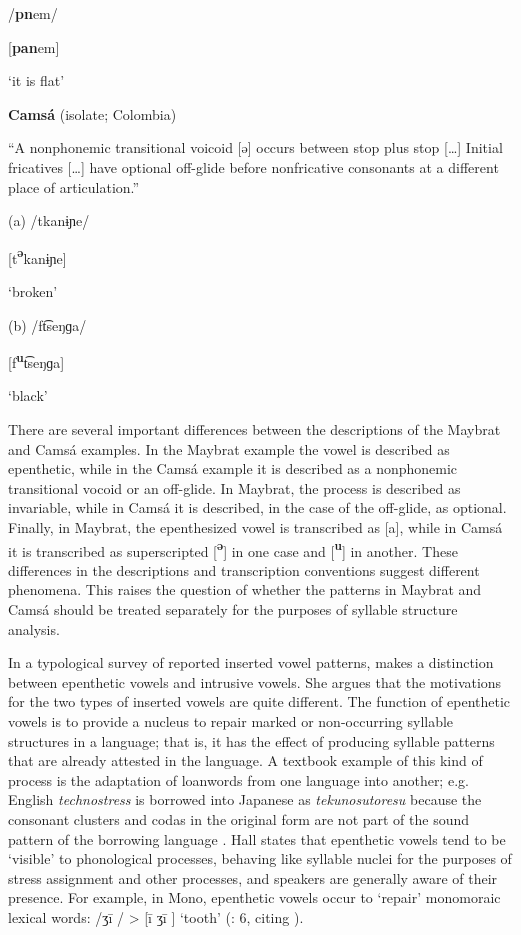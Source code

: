 /\textbf{pn}em/

[\textbf{pan}em]

\glt ‘it is flat’

\citep[35-6]{Dol2007}
\z

\ea\label{ex:(3.9)}
  \textbf{Camsá} (isolate; Colombia)

“A nonphonemic transitional voicoid [ə] occurs between stop plus stop […] Initial fricatives […] have optional off-glide before nonfricative consonants at a different place of articulation.” 

(a)   /tkanɨɲe/

  [t\textbf{\textsuperscript{ə}}kanɨɲe]

  ‘broken’

(b)   /ft͡seŋɡa/

  [f\textbf{\textsuperscript{u}}t͡seŋɡa]

  ‘black’

\citep[81]{Howard1967}

\z

  There are several important differences between the descriptions of the Maybrat and Camsá examples. In the Maybrat example the vowel is described as epenthetic, while in the Camsá example it is described as a nonphonemic transitional vocoid or an off-glide. In Maybrat, the process is described as invariable, while in Camsá it is described, in the case of the off-glide, as optional. Finally, in Maybrat, the epenthesized vowel is transcribed as [a], while in Camsá it is transcribed as superscripted [\textbf{\textsuperscript{ə}}] in one case and [\textbf{\textsuperscript{u}}] in another. These differences in the descriptions and transcription conventions suggest different phenomena. This raises the question of whether the patterns in Maybrat and Camsá should be treated separately for the purposes of syllable structure analysis.

  In a typological survey of reported inserted vowel patterns, \citet{Hall2006} makes a distinction between epenthetic vowels and intrusive vowels. She argues that the motivations for the two types of inserted vowels are quite different. The function of epenthetic vowels is to provide a nucleus to repair marked or non-occurring syllable structures in a language; that is, it has the effect of producing syllable patterns that are already attested in the language. A textbook example of this kind of process is the adaptation of loanwords from one language into another; e.g. English \textit{technostress} is borrowed into Japanese as \textit{tekunosutoresu} because the consonant clusters and codas in the original form are not part of the sound pattern of the borrowing language \citep[69]{Kay1995}. Hall states that epenthetic vowels tend to be ‘visible’ to phonological processes, behaving like syllable nuclei for the purposes of stress assignment and other processes, and speakers are generally aware of their presence. For example, in Mono, epenthetic vowels occur to ‘repair’ monomoraic lexical words: /ʒi\={} / > [i\={} ʒi\={} ] ‘tooth’ (\citealt{Hall2006}: 6, citing \citealt{Olson2003}).

